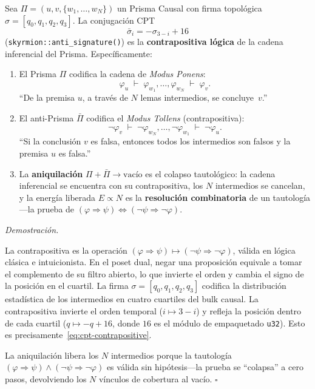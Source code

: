 \documentclass[11pt, a4paper, openany]{book}
\renewenvironment{proof}[1][Demostraci\'on]{%
  \par\noindent\textit{#1.}\quad
}{\hfill$\square$\par\medskip}
\begin{document}
\begin{theorem}
\label{thm:antimatter-tollens}
Sea $\Pi = (u, v, \{w_1, \ldots, w_N\})$ un Prisma Causal con firma
topol\'ogica $\sigma = [q_0, q_1, q_2, q_3]$. La conjugaci\'on CPT
\begin{equation}
  \bar{\sigma}_i = -\sigma_{3-i} + 16
  \label{eq:cpt-contrapositive}
\end{equation}
(\texttt{skyrmion::anti\_signature()}) es la \textbf{contrapositiva
l\'ogica} de la cadena inferencial del Prisma. Espec\'ificamente:

\begin{enumerate}
  \item El Prisma $\Pi$ codifica la cadena de \emph{Modus Ponens}:
    \begin{equation}
      \varphi_u \;\vdash\; \varphi_{w_1}, \ldots, \varphi_{w_N}
      \;\vdash\; \varphi_v.
    \end{equation}
    ``De la premisa $u$, a trav\'es de $N$ lemas intermedios, se
    concluye~$v$.''
  \item El anti-Prisma $\bar{\Pi}$ codifica el \emph{Modus Tollens}
    (contrapositiva):
    \begin{equation}
      \neg\varphi_v \;\vdash\; \neg\varphi_{w_N}, \ldots,
      \neg\varphi_{w_1} \;\vdash\; \neg\varphi_u.
    \end{equation}
    ``Si la conclusi\'on $v$ es falsa, entonces todos los
    intermedios son falsos y la premisa $u$ es falsa.''
  \item La \textbf{aniquilaci\'on} $\Pi + \bar{\Pi} \to \text{vac\'io}$
    es el colapso tautol\'ogico: la cadena inferencial se encuentra
    con su contrapositiva, los $N$ intermedios se cancelan, y
    la energ\'ia liberada $E \propto N$ es la \textbf{resoluci\'on
    combinatoria} de un tautolog\'ia---la prueba de
    $(\varphi \Rightarrow \psi) \Leftrightarrow
    (\neg\psi \Rightarrow \neg\varphi)$.
\end{enumerate}
\end{theorem}

\begin{proof}
La contrapositiva es la operaci\'on $(\varphi \Rightarrow \psi)
\mapsto (\neg\psi \Rightarrow \neg\varphi)$, v\'alida en
l\'ogica cl\'asica e intuicionista. En el poset dual, negar una
proposici\'on equivale a tomar el complemento de su filtro abierto,
lo que invierte el orden y cambia el signo de la posici\'on en el
cuartil. La firma $\sigma = [q_0, q_1, q_2, q_3]$ codifica la
distribuci\'on estad\'istica de los intermedios en cuatro cuartiles
del bulk causal. La contrapositiva invierte el orden temporal
($i \mapsto 3 - i$) y refleja la posici\'on dentro de cada cuartil
($q \mapsto -q + 16$, donde $16$ es el m\'odulo de empaquetado
\texttt{u32}). Esto es precisamente~\eqref{eq:cpt-contrapositive}.

La aniquilaci\'on libera los $N$ intermedios porque la tautolog\'ia
$(\varphi \Rightarrow \psi) \wedge (\neg\psi \Rightarrow
\neg\varphi)$ es v\'alida sin hip\'otesis---la prueba se ``colapsa''
a cero pasos, devolviendo los $N$ v\'inculos de cobertura al vac\'io.
\end{proof}
\end{document}

